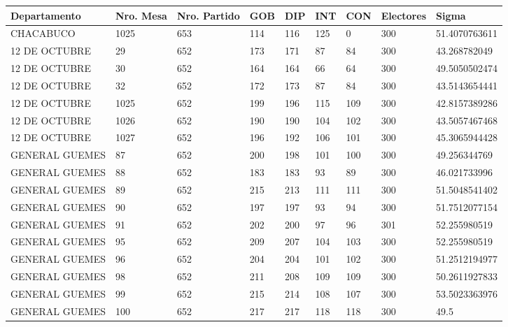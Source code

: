 \documentclass[12pt,a4paper]{article}
\begin{document}
\begin{table}[h!]
\centering
\begin{tabular}{lllllllll}
Departamento  & Nro. Mesa & Nro. Partido & GOB & DIP & INT & CON & Electores & Sigma         \\
\hline
CHACABUCO      & 1025      & 653          & 114 & 116 & 125 & 0   & 300       & 51.4070763611 \\
12 DE OCTUBRE  & 29        & 652          & 173 & 171 & 87  & 84  & 300       & 43.268782049  \\
12 DE OCTUBRE  & 30        & 652          & 164 & 164 & 66  & 64  & 300       & 49.5050502474 \\
12 DE OCTUBRE  & 32        & 652          & 172 & 173 & 87  & 84  & 300       & 43.5143654441 \\
12 DE OCTUBRE  & 1025      & 652          & 199 & 196 & 115 & 109 & 300       & 42.8157389286 \\
12 DE OCTUBRE  & 1026      & 652          & 190 & 190 & 104 & 102 & 300       & 43.5057467468 \\
12 DE OCTUBRE  & 1027      & 652          & 196 & 192 & 106 & 101 & 300       & 45.3065944428 \\
GENERAL GUEMES & 87        & 652          & 200 & 198 & 101 & 100 & 300       & 49.256344769  \\
GENERAL GUEMES & 88        & 652          & 183 & 183 & 93  & 89  & 300       & 46.021733996  \\
GENERAL GUEMES & 89        & 652          & 215 & 213 & 111 & 111 & 300       & 51.5048541402 \\
GENERAL GUEMES & 90        & 652          & 197 & 197 & 93  & 94  & 300       & 51.7512077154 \\
GENERAL GUEMES & 91        & 652          & 202 & 200 & 97  & 96  & 301       & 52.255980519  \\
GENERAL GUEMES & 95        & 652          & 209 & 207 & 104 & 103 & 300       & 52.255980519  \\
GENERAL GUEMES & 96        & 652          & 204 & 204 & 101 & 102 & 300       & 51.2512194977 \\
GENERAL GUEMES & 98        & 652          & 211 & 208 & 109 & 109 & 300       & 50.2611927833 \\
GENERAL GUEMES & 99        & 652          & 215 & 214 & 108 & 107 & 300       & 53.5023363976 \\
GENERAL GUEMES & 100       & 652          & 217 & 217 & 118 & 118 & 300       & 49.5          \\

\end{tabular}
\end{table}
\end{document}
